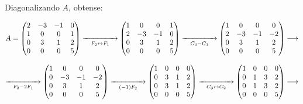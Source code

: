 \documentclass[twoside]{report}
\theoremstyle{mystyle}
\begin{document}
\noindent Diagonalizando $A$, obtense:

\[
A = 
\begin{pmatrix}
2 & -3 & -1 & 0\\
1 & 0 & 0 & 1\\
0 & 3 & 1 & 2\\
0 & 0 & 0 & 5
\end{pmatrix}
\underset{F_{2} \leftrightarrow F_{1}}{\xrightarrow{\hspace{15mm}}}
\begin{pmatrix}
1 & 0 & 0 & 1\\
2 & -3 & -1 & 0\\
0 & 3 & 1 & 2\\
0 & 0 & 0 & 5
\end{pmatrix}
\underset{C_{4} - C_{1}}{\xrightarrow{\hspace{15mm}}}
\begin{pmatrix}
1 & 0 & 0 & 0\\
2 & -3 & -1 & -2\\
0 & 3 & 1 & 2\\
0 & 0 & 0 & 5
\end{pmatrix}
\longrightarrow
\]

\vspace{3mm}

\[
\underset{F_{2} - 2F_{1}}{\xrightarrow{\hspace{15mm}}}
\begin{pmatrix}
1 & 0 & 0 & 0\\
0 & -3 & -1 & -2\\
0 & 3 & 1 & 2\\
0 & 0 & 0 & 5
\end{pmatrix}
\underset{(-1)F_{2}}{\xrightarrow{\hspace{15mm}}}
\begin{pmatrix}
1 & 0 & 0 & 0\\
0 & 3 & 1 & 2\\
0 & 3 & 1 & 2\\
0 & 0 & 0 & 5
\end{pmatrix}
\underset{C_{3} \leftrightarrow C_{2}}{\xrightarrow{\hspace{15mm}}}
\begin{pmatrix}
1 & 0 & 0 & 0\\
0 & 1 & 3 & 2\\
0 & 1 & 3 & 2\\
0 & 0 & 0 & 5
\end{pmatrix}
\longrightarrow
\]

\vspace{3mm}
\end{document}
